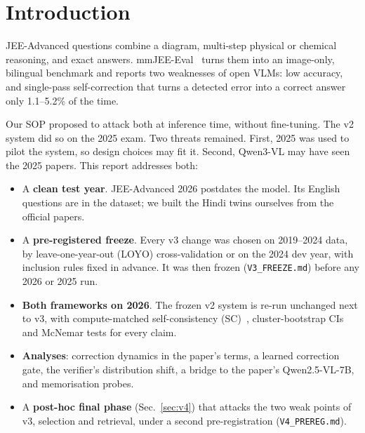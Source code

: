 \documentclass[conference]{IEEEtran}
\begin{document}
\section{Introduction}
JEE-Advanced questions combine a diagram, multi-step physical or chemical reasoning, and exact
answers. mmJEE-Eval~\cite{mmjee} turns them into an image-only, bilingual benchmark and reports
two weaknesses of open VLMs: low accuracy, and single-pass self-correction that turns a detected
error into a correct answer only 1.1--5.2\% of the time.

Our SOP proposed to attack both at inference time, without fine-tuning. The v2 system did so on
the 2025 exam. Two threats remained. First, 2025 was used to pilot the system, so design choices
may fit it. Second, Qwen3-VL may have seen the 2025 papers. This report addresses both:
\begin{itemize}
\item A \textbf{clean test year}. JEE-Advanced 2026 postdates the model. Its English questions are in
the dataset; we built the Hindi twins ourselves from the official papers.
\item A \textbf{pre-registered freeze}. Every v3 change was chosen on 2019--2024 data, by
leave-one-year-out (LOYO) cross-validation or on the 2024 dev year, with inclusion rules fixed
in advance. It was then frozen (\texttt{V3\_FREEZE.md}) before any 2026 or 2025 run.
\item \textbf{Both frameworks on 2026}. The frozen v2 system is re-run unchanged next to v3, with
compute-matched self-consistency (SC)~\cite{selfconsistency}, cluster-bootstrap CIs and McNemar
tests for every claim.
\item \textbf{Analyses}: correction dynamics in the paper's terms, a learned correction gate, the
verifier's distribution shift, a bridge to the paper's Qwen2.5-VL-7B, and memorisation probes.
\item A \textbf{post-hoc final phase} (Sec.~\ref{sec:v4}) that attacks the two weak points of v3,
selection and retrieval, under a second pre-registration (\texttt{V4\_PREREG.md}).
\end{itemize}

\end{document}
